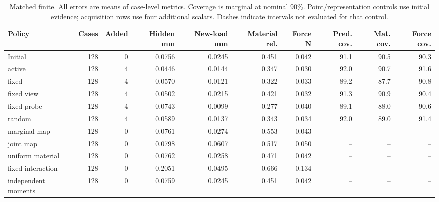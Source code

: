 \begin{table}[!t]\centering\small\setlength{\tabcolsep}{4pt}
\caption{Matched finite. All errors are means of case-level metrics. Coverage is marginal at nominal 90\%. Point/representation controls use initial evidence; acquisition rows use four additional scalars. Dashes indicate intervals not evaluated for that control.}
\begin{tabular}{lrrrrrrrrr}\toprule
Policy & Cases & Added & Hidden mm & New-load mm & Material rel. & Force N & Pred. cov. & Mat. cov. & Force cov.\\\midrule
Initial & 128 & 0 & 0.0756 & 0.0245 & 0.451 & 0.042 & 91.1 & 90.5 & 90.3\\
active & 128 & 4 & 0.0446 & 0.0144 & 0.347 & 0.030 & 92.0 & 90.7 & 91.6\\
fixed & 128 & 4 & 0.0570 & 0.0121 & 0.322 & 0.033 & 89.2 & 87.7 & 90.8\\
fixed view & 128 & 4 & 0.0502 & 0.0215 & 0.421 & 0.032 & 91.3 & 90.9 & 90.4\\
fixed probe & 128 & 4 & 0.0743 & 0.0099 & 0.277 & 0.040 & 89.1 & 88.0 & 90.6\\
random & 128 & 4 & 0.0589 & 0.0137 & 0.343 & 0.034 & 92.0 & 89.0 & 91.4\\
marginal map & 128 & 0 & 0.0761 & 0.0274 & 0.553 & 0.043 & -- & -- & --\\
joint map & 128 & 0 & 0.0798 & 0.0607 & 0.517 & 0.050 & -- & -- & --\\
uniform material & 128 & 0 & 0.0762 & 0.0258 & 0.471 & 0.042 & -- & -- & --\\
fixed interaction & 128 & 0 & 0.2051 & 0.0495 & 0.666 & 0.134 & -- & -- & --\\
independent moments & 128 & 0 & 0.0759 & 0.0245 & 0.451 & 0.042 & -- & -- & --\\
\bottomrule\end{tabular}
\end{table}

